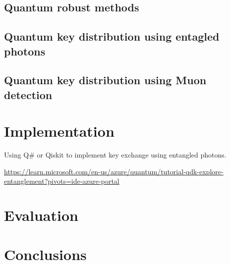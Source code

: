 \documentclass{article}
\begin{document}
\subsection{Quantum robust methods}

\subsection{Quantum key distribution using entagled photons}

\subsection{Quantum key distribution using Muon detection }

\section{Implementation}

Using Q# or Qiskit to implement key exchange using entangled photons.

\href{https://learn.microsoft.com/en-us/azure/quantum/tutorial-qdk-explore-entanglement?pivots=ide-azure-portal}{https://learn.microsoft.com/en-us/azure/quantum/tutorial-qdk-explore-entanglement?pivots=ide-azure-portal}

\section{Evaluation}

\section{Conclusions}
\end{document}
